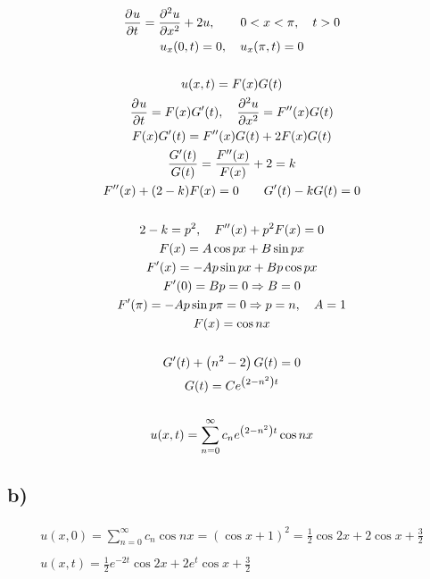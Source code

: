 \begin{gather*}
	\frac{\partial^{} u}{\partial t^{}} = \frac{\partial^{2} u}{\partial x^{2}} + 2 u,
	\qquad
	0 < x < \pi,
	\quad t > 0
	\\
	u_x(0, t) = 0,
	\quad
	u_x(\pi, t) = 0
	\\
	\\
	u(x, t) = F(x)G(t)
	\\
	\frac{\partial^{} u}{\partial t^{}} = F(x) G'(t),
	\quad
	\frac{\partial^{2} u}{\partial x^{2}} = F''(x)G(t)
	\\
	F(x)G'(t) = F''(x)G(t) + 2 F(x)G(t)
	\\
	\frac{G'(t)}{G(t)} = \frac{F''(x)}{F(x)} + 2 = k
	\\
	F''(x) + (2 - k) F(x) = 0
	\qquad
	G'(t) - k G(t) = 0
	\\
	\\
	2 - k = p^2, \quad F''(x) + p^2 F(x) = 0
	\\
	F(x) = A \cos{p x} + B \sin{p x}
	\\
	F'(x) = - A p \sin{p x} + B p \cos{p x}
	\\
	F'(0) = B p = 0 \Rightarrow B = 0
	\\
	F'(\pi) = -A p \sin{p \pi} = 0 \Rightarrow p = n, \quad A = 1
	\\
	F(x) = \cos{n x}
	\\
	\\
	G'(t) + \left(n^2 - 2\right) G(t) = 0
	\\
	G(t) = C e^{\left(2 - n^2\right) t}
	\\
	\\
	u(x, t) = \sum_{n = 0}^\infty{
		c_n e^{\left(2 - n^2\right) t} \cos{n x}
	}
\end{gather*}

\subsection*{b)}

\begin{gather*}
	u(x, 0) = \sum_{n = 0}^\infty{c_n \cos{n x}}
	=
	(\cos{x} + 1)^2
	=
	\frac{1}{2} \cos{2 x} + 2 \cos{x} + \frac{3}{2}
	\\
	\\
	u(x, t) = \frac{1}{2} e^{-2 t} \cos{2 x} + 2 e^{t} \cos{x} + \frac{3}{2}
\end{gather*}
